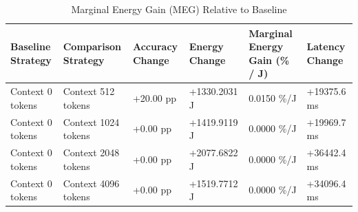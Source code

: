 \begin{table}
\caption{Marginal Energy Gain (MEG) Relative to Baseline}
\label{tab:marginal_energy_gain}
\begin{tabular}{llllll}
\toprule
Baseline Strategy & Comparison Strategy & Accuracy Change & Energy Change & Marginal Energy Gain (\% / J) & Latency Change \\
\midrule
Context 0 tokens & Context 512 tokens & +20.00 pp & +1330.2031 J & 0.0150 \%/J & +19375.6 ms \\
Context 0 tokens & Context 1024 tokens & +0.00 pp & +1419.9119 J & 0.0000 \%/J & +19969.7 ms \\
Context 0 tokens & Context 2048 tokens & +0.00 pp & +2077.6822 J & 0.0000 \%/J & +36442.4 ms \\
Context 0 tokens & Context 4096 tokens & +0.00 pp & +1519.7712 J & 0.0000 \%/J & +34096.4 ms \\
\bottomrule
\end{tabular}
\end{table}

